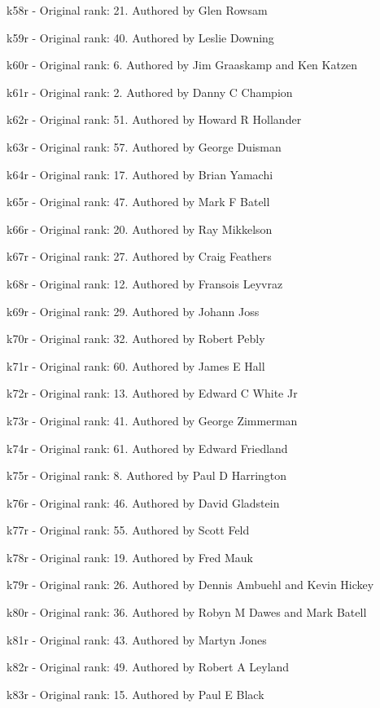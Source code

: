 \item k58r - Original rank: 21. Authored by Glen Rowsam
\item k59r - Original rank: 40. Authored by Leslie Downing
\item k60r - Original rank: 6. Authored by Jim Graaskamp and Ken Katzen
\item k61r - Original rank: 2. Authored by Danny C Champion
\item k62r - Original rank: 51. Authored by Howard R Hollander
\item k63r - Original rank: 57. Authored by George Duisman
\item k64r - Original rank: 17. Authored by Brian Yamachi
\item k65r - Original rank: 47. Authored by Mark F Batell
\item k66r - Original rank: 20. Authored by Ray Mikkelson
\item k67r - Original rank: 27. Authored by Craig Feathers
\item k68r - Original rank: 12. Authored by Fransois Leyvraz
\item k69r - Original rank: 29. Authored by Johann Joss
\item k70r - Original rank: 32. Authored by Robert Pebly
\item k71r - Original rank: 60. Authored by James E Hall
\item k72r - Original rank: 13. Authored by Edward C White Jr
\item k73r - Original rank: 41. Authored by George Zimmerman
\item k74r - Original rank: 61. Authored by Edward Friedland
\item k75r - Original rank: 8. Authored by Paul D Harrington
\item k76r - Original rank: 46. Authored by David Gladstein
\item k77r - Original rank: 55. Authored by Scott Feld
\item k78r - Original rank: 19. Authored by Fred Mauk
\item k79r - Original rank: 26. Authored by Dennis Ambuehl and Kevin Hickey
\item k80r - Original rank: 36. Authored by Robyn M Dawes and Mark Batell
\item k81r - Original rank: 43. Authored by Martyn Jones
\item k82r - Original rank: 49. Authored by Robert A Leyland
\item k83r - Original rank: 15. Authored by Paul E Black
